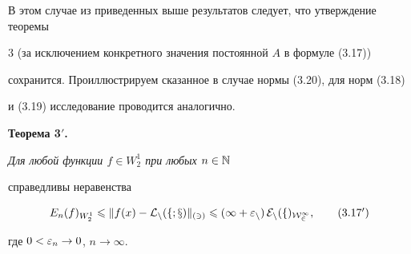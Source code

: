 В этом случае из приведенных выше результатов следует, что утверждение теоремы 


3 (за исключением конкретного значения постоянной $A$ в формуле (3.17)) 


сохранится. Проиллюстрируем сказанное в случае нормы (3.20), для норм (3.18) 


и (3.19) исследование проводится аналогично.


\medskip





{\bf Теорема 3$'$.} {\it Для любой функции $f\in W_2^1$ при любых $n\in \Bbb{N}$


справедливы неравенства


\begin{equation}


E_n(f)_{W_2^1}\lea \|f(x)-\cal{L}_n(f;x)\|_{(3)}\lea


(1+\varepsilon_n)\, E_n(f)_{W_2^1},


\tag{3.17${}'$}


\end{equation}


где $0<\varepsilon_n\to 0$, $n\to \infty$.


}








